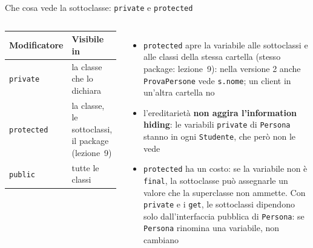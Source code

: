 \documentclass[10pt,aspectratio=169]{beamer}
\begin{document}
\begin{frame}[fragile]{Che cosa vede la sottoclasse: \texttt{private} e \texttt{protected}}
\begin{columns}[T]
\footnotesize
\begin{center}
\renewcommand{\arraystretch}{1.2}
\begin{tabular}{@{}lp{5.6cm}@{}}
\toprule
\textbf{Modificatore} & \textbf{Visibile in} \\
\midrule
\texttt{private} & la classe che lo dichiara \\
\texttt{protected} & la classe, le sottoclassi, il package (lezione~9) \\
\texttt{public} & tutte le classi \\
\bottomrule
\end{tabular}
\end{center}
\begin{itemize}\itemsep=2pt
    \item \texttt{protected} apre la variabile alle sottoclassi e alle classi della stessa cartella (stesso package: lezione~9): nella versione 2 anche \texttt{ProvaPersone} vede \texttt{s.nome}; un client in un'altra cartella no
    \item l'ereditarietà \textbf{non aggira l'information hiding}: le variabili \texttt{private} di \texttt{Persona} stanno in ogni \texttt{Studente}, che però non le vede
    \item \texttt{protected} ha un costo: se la variabile non è \texttt{final}, la sottoclasse può assegnarle un valore che la superclasse non ammette. Con \texttt{private} e i \texttt{get}, le sottoclassi dipendono solo dall'interfaccia pubblica di \texttt{Persona}: se \texttt{Persona} rinomina una variabile, non cambiano
\end{itemize}
\end{columns}
\end{frame}
\end{document}
